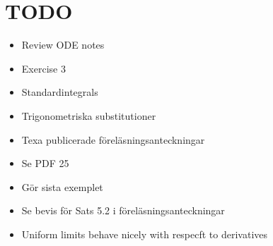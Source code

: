\section{TODO}\par
\begin{itemize}
  \item Review ODE notes
  \item Exercise 3
  \item Standardintegrals
  \item Trigonometriska substitutioner
  \item Texa publicerade föreläsningsanteckningar 
  \item Se PDF 25
  \item Gör sista exemplet
  \item Se bevis för Sats 5.2 i föreläsningsanteckningar
  \item Uniform limits behave nicely with respecft to derivatives
\end{itemize}
